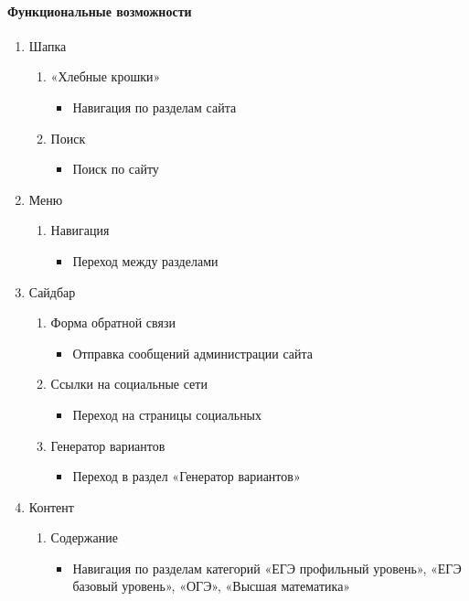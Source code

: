 \paragraph{Функциональные возможности}
\begin{enumerate}

	\item Шапка
	\begin{enumerate}
		\item «Хлебные крошки»
		\begin{itemize}
			\item Навигация по разделам сайта
		\end{itemize}
		\item Поиск
		\begin{itemize}
			\item Поиск по сайту
		\end{itemize}
	\end{enumerate}

	\item Меню
	\begin{enumerate}
		\item Навигация
		\begin{itemize}
			\item Переход между разделами
		\end{itemize}
	\end{enumerate}

	\item Сайдбар
	\begin{enumerate}
		\item Форма обратной связи
		\begin{itemize}
			\item Отправка сообщений администрации сайта
		\end{itemize}

		\item Ссылки на социальные сети
		\begin{itemize}
			\item Переход на страницы социальных
		\end{itemize}

		\item Генератор вариантов
		\begin{itemize}
			\item Переход в раздел «Генератор вариантов»
		\end{itemize}
	\end{enumerate}

	\item Контент
	\begin{enumerate}
		\item Содержание
		\begin{itemize}
			\item Навигация по разделам категорий «ЕГЭ профильный уровень», «ЕГЭ базовый уровень», «ОГЭ», «Высшая математика»
		\end{itemize}
	\end{enumerate}


\end{enumerate}
